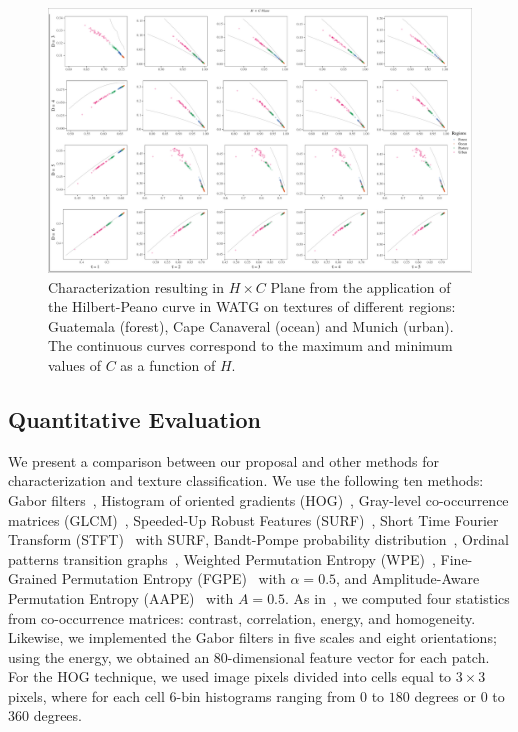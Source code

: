 \documentclass[journal]{IEEEtran}
\begin{document}
\begin{itemize}
	\begin{figure}
		\centering
		\includegraphics[width=1\textwidth]{Figures/WATGHC.pdf}
		\caption{Characterization resulting in $H \times C$ Plane from the application of the Hilbert-Peano curve in WATG on textures of different regions: Guatemala (forest), Cape Canaveral (ocean) and Munich (urban). 
		The continuous curves correspond to the maximum and minimum values of $C$ as a function of $H$.}
		\label{fig:Regions}
	\end{figure}
	
	\subsection{Quantitative Evaluation}
	
	We present a comparison between our proposal and other methods for characterization and texture classification.
    We use the following ten methods: 
	Gabor filters~\cite{weldon1996efficient},  
    Histogram of oriented gradients (HOG)~\cite{dalal2005histograms},
	Gray-level co-occurrence matrices (GLCM)~\cite{kourgli2012texture}, 
    Speeded-Up Robust Features (SURF)~\cite{bay2006surf},
    Short Time Fourier Transform (STFT)~\cite{portnoff1980time} with SURF,
	Bandt-Pompe probability distribution~\cite{Bandt2002Permutation}, 
	Ordinal patterns transition graphs~\cite{Borges2019Transition},
	Weighted Permutation Entropy (WPE)~\cite{Fadlallah2013Weightedpermutation},
	Fine-Grained Permutation Entropy (FGPE)~\cite{xiao2009fine} with $\alpha = 0.5$, and
	Amplitude-Aware Permutation Entropy (AAPE)~\cite{azami2016amplitude} with $A = 0.5$.
	As in~\cite{guan2019covariance}, 
    we computed four statistics from co-occurrence matrices: contrast, correlation, energy, and homogeneity.
    Likewise, we implemented the Gabor filters in five scales and eight orientations; using the energy, we obtained an $80$-dimensional feature vector for each patch.
    For the HOG technique, we used image pixels divided into cells equal to $3 \times 3$ pixels, where for each cell 6-bin histograms ranging from $0$ to $180$ degrees or $0$ to $360$ degrees.
	

\end{itemize}
\end{document}
